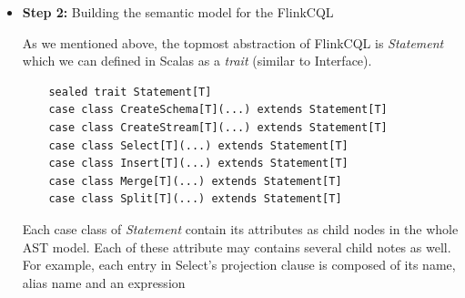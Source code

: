 \begin{itemize}
The topmost abstraction of the FlinkCQL grammar is \textit{Statement}. It can express either \textit{Select}, \textit{Create schema}, \textit{Create stream}, \textit{Merge}, \textit{Insert}, \textit{Split} query syntax.
\begin{lstlisting}
lazy val stmt = (selectStmtSyntax| createSchemaStmtSyntax | createStreamStmtSyntax | MergeStmtSyntax  | insertStmtSyntax| splitStmtSyntax)
\end{lstlisting}

The parsing process of the grammar will generate a parse tree but the ouput tree is represented by a string. Let us consider the parse tree of the sample query:
\begin{lstlisting}
((List(((((s~.)~Quantity),*,Price)~None),(((StockTick~.)~Symbol)~None))~(((StockTick~None)~Some(s))~None))~None)~None
\end{lstlisting}
The List denote that the query require 2 entries in projection clause. The last 2 \textit{None} values express that \textit{Where} clause and \textit{GroupBy} clause is missing.

However, this output format is useless for next steps since it is also a string in a different way. Thus, we need to design a more powerful abstract semantic model and integrate it to the parser tree so that the parser will return a \textbf{Statement} object , instead of a string. Once we obtain a \textbf{Statement} object, we are able to extract  exploit its components recursively for further. As long as we build a complete semantic model for FlinkCQL (in Step 2), Scala offers a bunch of function application combinators to plug directly these semantic abstractions to the parse rules (in Step 3)

\item \textbf{Step 2:} Building the semantic model for the FlinkCQL

As we mentioned above, the topmost abstraction of FlinkCQL is \textit{Statement} which we can defined in Scalas as a \textit{trait} (similar to Interface).
\begin{lstlisting}
	sealed trait Statement[T]
	case class CreateSchema[T](...) extends Statement[T]
	case class CreateStream[T](...) extends Statement[T]
	case class Select[T](...) extends Statement[T]
	case class Insert[T](...) extends Statement[T]
	case class Merge[T](...) extends Statement[T]
	case class Split[T](...) extends Statement[T]
\end{lstlisting}

Each case class of \textit{Statement} contain its attributes as child nodes in the whole AST model. Each of these attribute may contains several child notes as well. For example, each entry in Select's projection clause is composed of its name, alias name and an expression


\end{itemize}
